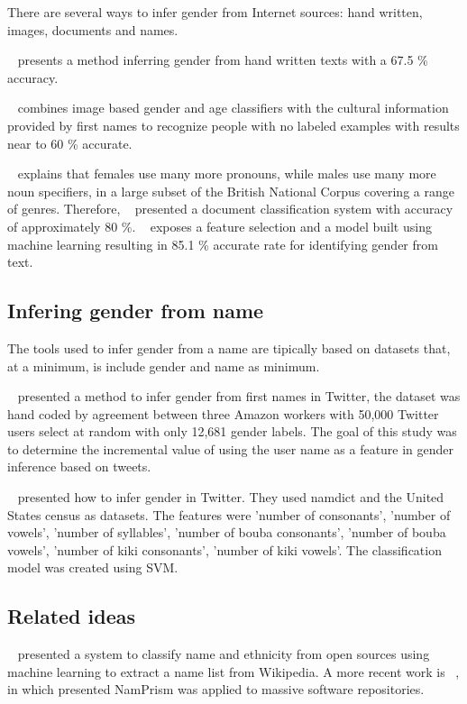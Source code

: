 \documentclass[a4paper]{article}
\begin{document}
There are several ways to infer gender from Internet
sources: hand written, images, documents and names.

~\cite{liwicki2011automatic} presents a method inferring gender from
hand written texts with a 67.5 \% accuracy.

~\cite{gallagher2008estimating} combines image based gender and age
classifiers with the cultural information provided by first
names to recognize people with no labeled examples with results near
to 60 \% accurate.

~\cite{argamon2003gender} explains that females use many more
pronouns, while males use many more noun specifiers, in a large subset of
the British National Corpus covering a range of genres. Therefore,
~\cite{koppel2002automatically} presented a document classification
system with accuracy of approximately 80 \%. ~\cite{cheng2011author}
exposes a feature selection and a model built using machine learning
resulting in 85.1 \% accurate rate for identifying gender from text.

\subsection{Infering gender from name}

The tools used to infer gender from a name are tipically based on
datasets that, at a minimum, is include gender and name as minimum.

~\cite{liu2013s} presented a method to infer gender from
first names in Twitter, the dataset was hand coded by agreement
between three Amazon workers with 50,000 Twitter users select at
random with only 12,681 gender labels. The goal of this study was
to determine the incremental value of using the user name as a feature
in gender inference based on tweets.

~\cite{mueller2016gender} presented how to infer gender in
Twitter. They used namdict and the United States census as datasets. The
features were 'number of consonants', 'number of vowels', 'number of
syllables', 'number of bouba consonants', 'number of bouba vowels',
'number of kiki consonants', 'number of kiki vowels'. The
classification model was created using SVM.

\subsection{Related ideas}

~\cite{ambekar2009name} presented a system to classify name
and ethnicity from open sources using machine learning to
extract a name list from Wikipedia. A more recent work is
~\cite{nadri2021relationship}, in which presented NamPrism was
applied to massive software repositories.
\end{document}
